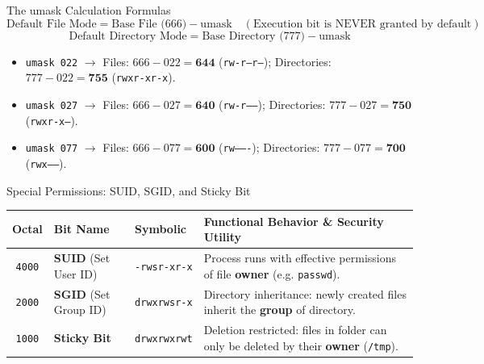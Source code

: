\begin{cheatbox}{The umask Calculation Formulas}
\begin{equation}
\text{Default File Mode} = \text{Base File (666)} - \text{umask} \quad (\text{Execution bit is NEVER granted by default})
\end{equation}
\begin{equation}
\text{Default Directory Mode} = \text{Base Directory (777)} - \text{umask}
\end{equation}
\begin{itemize}[leftmargin=1.5em]
    \item \texttt{umask 022} $\to$ Files: $666 - 022 = \mathbf{644}$ (\texttt{rw-r--r--}); Directories: $777 - 022 = \mathbf{755}$ (\texttt{rwxr-xr-x}).
    \item \texttt{umask 027} $\to$ Files: $666 - 027 = \mathbf{640}$ (\texttt{rw-r-----}); Directories: $777 - 027 = \mathbf{750}$ (\texttt{rwxr-x---}).
    \item \texttt{umask 077} $\to$ Files: $666 - 077 = \mathbf{600}$ (\texttt{rw-------}); Directories: $777 - 077 = \mathbf{700}$ (\texttt{rwx------}).
\end{itemize}
\end{cheatbox}

\begin{syntaxbox}{Special Permissions: SUID, SGID, and Sticky Bit}
\begin{tabularx}{\linewidth}{c l l X}
\toprule
\textbf{Octal} & \textbf{Bit Name} & \textbf{Symbolic} & \textbf{Functional Behavior \& Security Utility} \\
\midrule
\texttt{4000} & \textbf{SUID} (Set User ID) & \texttt{-rwsr-xr-x} & Process runs with effective permissions of file \textbf{owner} (e.g. \texttt{passwd}). \\
\texttt{2000} & \textbf{SGID} (Set Group ID) & \texttt{drwxrwsr-x} & Directory inheritance: newly created files inherit the \textbf{group} of directory. \\
\texttt{1000} & \textbf{Sticky Bit} & \texttt{drwxrwxrwt} & Deletion restricted: files in folder can only be deleted by their \textbf{owner} (\texttt{/tmp}). \\
\bottomrule
\end{tabularx}
\end{syntaxbox}

